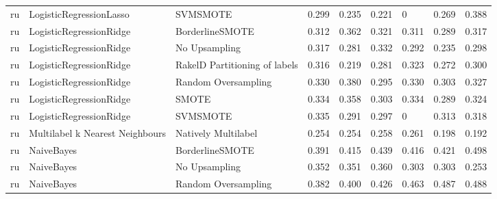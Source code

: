 \begin{tabular}{lllllllll}
      ru &         LogisticRegressionLasso &                      SVMSMOTE & 0.299 &                     0.235 &                 0.221 &                      0 &                                   0.269 &     0.388 \\
      ru &         LogisticRegressionRidge &               BorderlineSMOTE & 0.312 &                     0.362 &                 0.321 &                  0.311 &                                   0.289 &     0.317 \\
      ru &         LogisticRegressionRidge &                 No Upsampling & 0.317 &                     0.281 &                 0.332 &                  0.292 &                                   0.235 &     0.298 \\
      ru &         LogisticRegressionRidge & RakelD Partitioning of labels & 0.316 &                     0.219 &                 0.281 &                  0.323 &                                   0.272 &     0.300 \\
      ru &         LogisticRegressionRidge &           Random Oversampling & 0.330 &                     0.380 &                 0.295 &                  0.330 &                                   0.303 &     0.327 \\
      ru &         LogisticRegressionRidge &                         SMOTE & 0.334 &                     0.358 &                 0.303 &                  0.334 &                                   0.289 &     0.324 \\
      ru &         LogisticRegressionRidge &                      SVMSMOTE & 0.335 &                     0.291 &                 0.297 &                      0 &                                   0.313 &     0.318 \\
      ru & Multilabel k Nearest Neighbours &           Natively Multilabel & 0.254 &                     0.254 &                 0.258 &                  0.261 &                                   0.198 &     0.192 \\
      ru &                      NaiveBayes &               BorderlineSMOTE & 0.391 &                     0.415 &                 0.439 &                  0.416 &                                   0.421 &     0.498 \\
      ru &                      NaiveBayes &                 No Upsampling & 0.352 &                     0.351 &                 0.360 &                  0.303 &                                   0.303 &     0.253 \\
      ru &                      NaiveBayes &           Random Oversampling & 0.382 &                     0.400 &                 0.426 &                  0.463 &                                   0.487 &     0.488 \\

\end{tabular}

